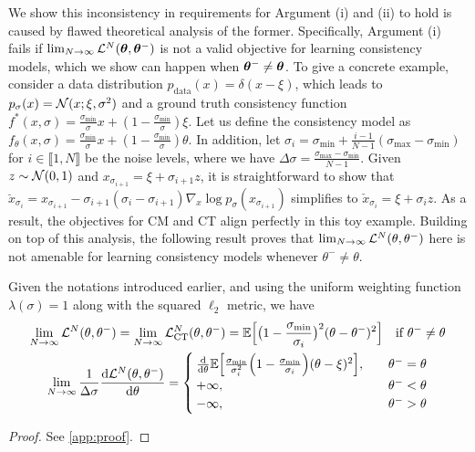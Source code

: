 We show this inconsistency in requirements for Argument (i) and (ii) to hold is caused by flawed theoretical analysis of the former. Specifically, Argument (i) fails if $\lim_{N \to \infty}\mathcal{L}^N({\bm{\theta}}, {\bm{\theta}}^{-})$ is not a valid objective for learning consistency models, which we show can happen when ${\bm{\theta}}^{-} \neq {\bm{\theta}}$. To give a concrete example, consider a data distribution $p_\text{data}(x) = \delta(x - \xi)$, which leads to $p_\sigma(x) = \mathcal{N}(x; \xi, \sigma^2)$ and a ground truth consistency function $f^*(x, \sigma) = \frac{\sigma_\text{min}}{\sigma}x + \left(1 - \frac{\sigma_\text{min}}{\sigma}\right)\xi$. Let us define the consistency model as $f_\theta(x, \sigma) = \frac{\sigma_\text{min}}{\sigma}x + \left(1 - \frac{\sigma_\text{min}}{\sigma}\right)\theta$. In addition, let $\sigma_i = \sigma_\text{min} + \frac{i-1}{N-1}(\sigma_\text{max} - \sigma_\text{min})$ for $i \in \llbracket 1, N \rrbracket$ be the noise levels, where we have $\Delta \sigma = \frac{\sigma_\text{max} - \sigma_\text{min}}{N-1}$. Given $z\sim \mathcal{N}(0, 1)$ and $x_{\sigma_{i+1}} = \xi + \sigma_{i+1} z$, it is straightforward to show that $\breve{x}_{\sigma_i} = x_{\sigma_{i+1}} - \sigma_{i+1}(\sigma_i - \sigma_{i+1}) \nabla_x \log p_\sigma(x_{\sigma_{i+1}})$ simplifies to $\check{x}_{\sigma_i} = \xi + \sigma_i z$. As a result, the objectives for CM and CT align perfectly in this toy example. Building on top of this analysis, the following result proves that $\lim_{N \to \infty}\mathcal{L}^N(\theta, \theta^{-})$ here is not amenable for learning consistency models whenever $\theta^{-} \neq \theta$.%
\begin{proposition}\label{prop}
    Given the notations introduced earlier, and using the uniform weighting function $\lambda(\sigma) = 1$ along with the squared $\ell_2$ metric, we have
    \begin{gather}
        \lim_{N \to \infty}\mathcal{L}^N(\theta, \theta^-) = \lim_{N \to \infty}\mathcal{L}^N_\text{CT}(\theta, \theta^-) = \mathbb{E}\Big[ \big(1 - \frac{\sigma_\text{min}}{\sigma_i} \big)^2(\theta - \theta^{-})^2\Big]\quad \text{if $\theta^{-} \neq \theta$}\label{eq:limit}\\
        \lim_{N \to \infty}\frac{1}{\Delta \sigma} \frac{\mathop{}\!\mathrm{d} \mathcal{L}^N(\theta, \theta^{-})}{\mathop{}\!\mathrm{d} \theta} = \begin{cases}
            \frac{\mathop{}\!\mathrm{d}}{\mathop{}\!\mathrm{d}\theta} \mathbb{E}\Big[ \frac{\sigma_\text{min}}{\sigma_i^2}\Big( 1 - \frac{\sigma_\text{min}}{\sigma_i} \Big)(\theta - \xi)^2 \Big], &\quad \theta^{-} = \theta\\
            +\infty, &\quad \theta^{-} < \theta \\
            -\infty, &\quad \theta^{-} > \theta \\
        \end{cases}\label{eq:grad_limit}
    \end{gather}
\end{proposition}
\begin{proof}
    See \cref{app:proof}.
\end{proof}



